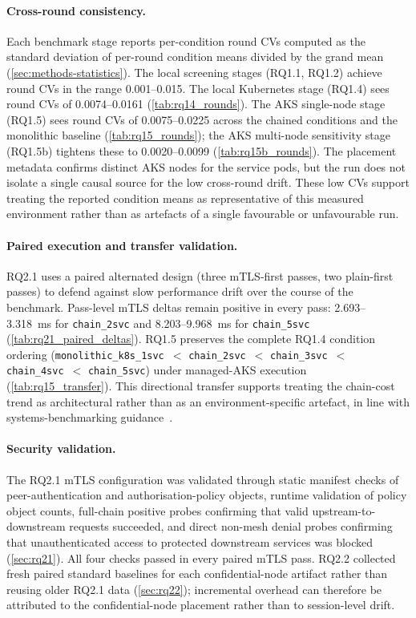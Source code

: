 \paragraph{Cross-round consistency.}
Each benchmark stage reports per-condition round CVs computed as the standard
deviation of per-round condition means divided by the grand mean
(\cref{sec:methods-statistics}). The local screening stages (RQ1.1, RQ1.2)
achieve round CVs in the range 0.001--0.015. The local Kubernetes stage
(RQ1.4) sees round CVs of 0.0074--0.0161 (\cref{tab:rq14_rounds}). The AKS
single-node stage (RQ1.5) sees round CVs of 0.0075--0.0225 across the chained
conditions and the monolithic baseline (\cref{tab:rq15_rounds}); the AKS
multi-node sensitivity stage (RQ1.5b) tightens these to 0.0020--0.0099
(\cref{tab:rq15b_rounds}). The placement metadata confirms distinct AKS nodes
for the service pods, but the run does not isolate a single causal source for
the low cross-round drift. These low CVs support treating the reported
condition means as representative of this measured environment rather than as
artefacts of a single favourable or unfavourable run.

\paragraph{Paired execution and transfer validation.}
RQ2.1 uses a paired alternated design (three mTLS-first passes, two
plain-first passes) to defend against slow performance drift over the course
of the benchmark. Pass-level mTLS deltas remain positive in every pass:
2.693--3.318~ms for \texttt{chain\_2svc} and 8.203--9.968~ms for
\texttt{chain\_5svc} (\cref{tab:rq21_paired_deltas}). RQ1.5 preserves the
complete RQ1.4 condition ordering (\texttt{monolithic\_k8s\_1svc}~$<$
\texttt{chain\_2svc}~$<$ \texttt{chain\_3svc}~$<$ \texttt{chain\_4svc}~$<$
\texttt{chain\_5svc}) under managed-AKS execution
(\cref{tab:rq15_transfer}). This directional transfer supports treating the
chain-cost trend as architectural rather than as an environment-specific
artefact, in line with systems-benchmarking
guidance~\cite{benchmarking_sc15}.

\paragraph{Security validation.}
The RQ2.1 mTLS configuration was validated through static manifest checks of
peer-authentication and authorisation-policy objects, runtime validation of
policy object counts, full-chain positive probes confirming that valid
upstream-to-downstream requests succeeded, and direct non-mesh denial probes
confirming that unauthenticated access to protected downstream services was
blocked (\cref{sec:rq21}). All four checks passed in every paired mTLS
pass. RQ2.2 collected fresh paired standard baselines for each
confidential-node artifact rather than reusing older RQ2.1 data
(\cref{sec:rq22}); incremental overhead can therefore be attributed to the
confidential-node placement rather than to session-level drift.


